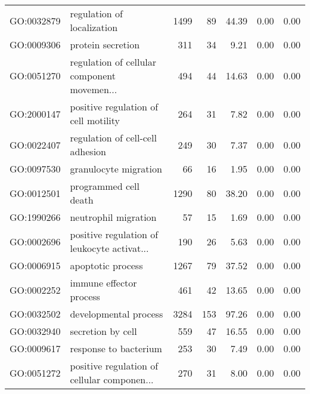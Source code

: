 \begin{table}[ht]
\begin{tabular}{llrrrrr}
  GO:0032879 & regulation of localization & 1499 &  89 & 44.39 & 0.00 & 0.00 \\ 
  GO:0009306 & protein secretion & 311 &  34 & 9.21 & 0.00 & 0.00 \\ 
  GO:0051270 & regulation of cellular component movemen... & 494 &  44 & 14.63 & 0.00 & 0.00 \\ 
  GO:2000147 & positive regulation of cell motility & 264 &  31 & 7.82 & 0.00 & 0.00 \\ 
  GO:0022407 & regulation of cell-cell adhesion & 249 &  30 & 7.37 & 0.00 & 0.00 \\ 
  GO:0097530 & granulocyte migration &  66 &  16 & 1.95 & 0.00 & 0.00 \\ 
  GO:0012501 & programmed cell death & 1290 &  80 & 38.20 & 0.00 & 0.00 \\ 
  GO:1990266 & neutrophil migration &  57 &  15 & 1.69 & 0.00 & 0.00 \\ 
  GO:0002696 & positive regulation of leukocyte activat... & 190 &  26 & 5.63 & 0.00 & 0.00 \\ 
  GO:0006915 & apoptotic process & 1267 &  79 & 37.52 & 0.00 & 0.00 \\ 
  GO:0002252 & immune effector process & 461 &  42 & 13.65 & 0.00 & 0.00 \\ 
  GO:0032502 & developmental process & 3284 & 153 & 97.26 & 0.00 & 0.00 \\ 
  GO:0032940 & secretion by cell & 559 &  47 & 16.55 & 0.00 & 0.00 \\ 
  GO:0009617 & response to bacterium & 253 &  30 & 7.49 & 0.00 & 0.00 \\ 
  GO:0051272 & positive regulation of cellular componen... & 270 &  31 & 8.00 & 0.00 & 0.00 \\ 
   \hline
\end{tabular}
\end{table}

